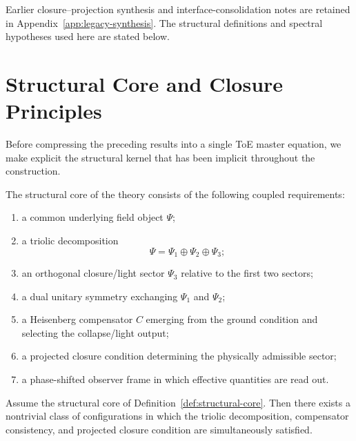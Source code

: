 \noindent Earlier closure--projection synthesis and interface-consolidation
notes are retained in Appendix~\ref{app:legacy-synthesis}. The structural
definitions and spectral hypotheses used here are stated below.

\section{Structural Core and Closure Principles}
\label{sec:structural-core}

Before compressing the preceding results into a single ToE master equation, we
make explicit the structural kernel that has been implicit throughout the
construction.

\begin{definition}
\label{def:structural-core}
The structural core of the theory consists of the following coupled
requirements:
\begin{enumerate}
\item a common underlying field object $\Psi$;
\item a triolic decomposition
\[
  \Psi = \Psi_1\oplus\Psi_2\oplus\Psi_3;
\]
\item an orthogonal closure/light sector $\Psi_3$ relative to the first two
sectors;
\item a dual unitary symmetry exchanging $\Psi_1$ and $\Psi_2$;
\item a Heisenberg compensator $C$ emerging from the ground condition and
selecting the collapse/light output;
\item a projected closure condition determining the physically admissible
sector;
\item a phase-shifted observer frame in which effective quantities are read
out.
\end{enumerate}
\end{definition}

\begin{theorem}
\label{thm:structural-existence}
Assume the structural core of Definition~\ref{def:structural-core}. Then there
exists a nontrivial class of configurations in which the triolic decomposition,
compensator consistency, and projected closure condition are simultaneously
satisfied.
\end{theorem}

